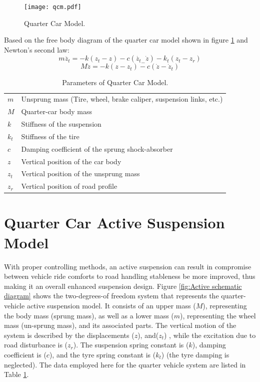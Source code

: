 \begin{figure}[H]
	\centering
	\texttt{[image: qcm.pdf]}
	
	\caption{Quarter Car Model\cite{researchgate_hybrid_control}.}
	\label{fig:qcm}
\end{figure}

Based on the free body diagram of the quarter car model shown in figure \ref{fig:qcm} and Newton's second law:
\begin{equation}
	m\ddot{z_t}=-k(z_t-z)-c(\dot{z_t}_-\dot{z})-k_t(z_t-z_r)
	\label{eqn:4.1}
\end{equation}
\begin{equation}
	M\ddot{z}=-k(z-z_t)-c(\dot{z}-\dot{z}_t)
	\label{eqn:4.2}
\end{equation}


\begin{table}[H]
	\centering
	\caption{Parameters of Quarter Car Model.}
	\begin{tabular}{ l|l }
		\hline
		$m$   & Unsprung mass (Tire, wheel, brake caliper, suspension links, etc.) \\
		$M$   & Quarter-car body mass                                              \\
		$k$   & Stiffness of the suspension                                        \\
		$k_t$ & Stiffness of the tire                                              \\
		$c$   & Damping coefficient of the sprung shock-absorber                   \\
		$z$   & Vertical position of the car body                                  \\
		$z_t$ & Vertical position of the unsprung mass                             \\
		$z_r$ & Vertical position of road profile                                  \\
		\hline
	\end{tabular}
	\label{table:qcm}
\end{table}


\section{Quarter Car Active Suspension Model}
With proper controlling methods, an active suspension can result in compromise
between vehicle ride comforts to road handling stableness be more improved, thus making
it an overall enhanced suspension design\cite{riduan2018review}.
Figure \ref{fig:Active schematic diagram} shows the two-degrees-of
freedom system that represents the quarter-vehicle active 
suspension model. It consists of an upper mass ($M$), 
representing the body mass (sprung mass), as well as a 
lower mass ($m$), representing the wheel mass (un-sprung 
mass), and its associated parts. The vertical motion of the 
system is described by the displacements ($z$), and($z_t$) , 
while the excitation due to road disturbance is ($z_r$). The 
suspension spring constant is ($k$), damping coefficient is 
($c$), and the tyre spring constant is ($k_t$) (the tyre damping is 
neglected). The data employed here for the quarter
vehicle system are listed in Table \ref{table:qcm}. 

